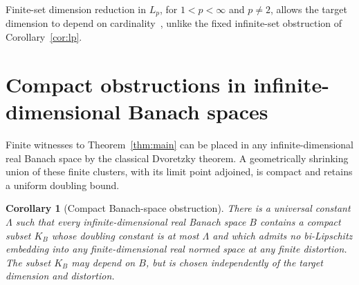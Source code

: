 \documentclass[11pt]{article}
\newtheorem{corollary}[theorem]{Corollary}
\begin{document}
Finite-set dimension reduction in $L_p$, for $1<p<\infty$ and $p\ne2$,
allows the target dimension to depend on cardinality~\cite[Theorem~1.1]{OpenAI2026LpReduction},
unlike the fixed infinite-set obstruction of Corollary~\ref{cor:lp}.

\section{Compact obstructions in infinite-dimensional Banach spaces}
\label{sec:banach}
Finite witnesses to Theorem~\ref{thm:main} can be placed in any infinite-dimensional real Banach space by the classical Dvoretzky theorem. A geometrically shrinking union of these finite clusters, with its limit point adjoined, is compact and retains a uniform doubling bound.

\begin{corollary}[Compact Banach-space obstruction]\label{cor:banach}
There is a universal constant $\Lambda$ such that every infinite-dimensional real Banach space $B$ contains a compact subset $K_B$ whose doubling constant is at most $\Lambda$ and which admits no bi-Lipschitz embedding into any finite-dimensional real normed space at any finite distortion. The subset $K_B$ may depend on $B$, but is chosen independently of the target dimension and distortion.
\end{corollary}
\end{document}
